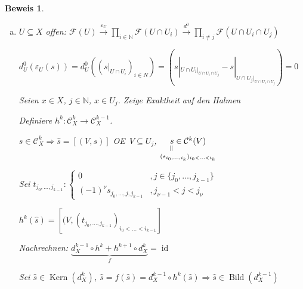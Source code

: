 \documentclass[paper = A4, fontsize=12pt, numbers=noendperiod, chapterprefix=true]{scrbook}
\theoremstyle{break}
\theoremstyle{nonumberbreak}
\newtheorem{bew}{Beweis}
\theoremstyle{nonumberplain}
\newcommand{\verteq}{\rotatebox{90}{$=$}}
\newcommand{\Prod}{\prod\limits}
\DeclareMathOperator{\Bild}{Bild}
\DeclareMathOperator{\Kern}{Kern}
\DeclareMathOperator{\id}{id}
\newcommand{\N}{\mathbb{N}}
\newcommand{\calC}{\mathcal{C}}
\newcommand{\calF}{\mathcal{F}}
\renewcommand{\OE}{O\!\!E~}
\begin{document}
\begin{bew}\begin{enumerate}[a)]\item[d)]
$U \subseteq X$ offen: $\calF(U) \xrightarrow{\varepsilon_U} \Prod_{i \in \N} \calF(U \cap U_i) \xrightarrow{d^0} \Prod_{i \ne j} \calF(U \cap U_i \cap U_j)$

$d_U^0(\varepsilon_U(s)) = d_U^0((s|_{U \cap U_i})_{i \in N}) = (s|_{U \cap U_i|_{U \cap U_i \cap U_j}} - s|_{U \cap U_j|_{U \cap U_i \cap U_j}}) = 0$

Seien $x \in X$, $j \in \N$, $x \in U_j$. Zeige Exaktheit auf den Halmen
\begin{center}\end{center}

Definiere $h^k: \calC_X^k \to \calC_X^{k-1}$.

$s \in \calC_X^k \Rightarrow \hat s = [(V, s)]$ \OE $V \subseteq U_j$, $\underset{\substack{(s_{i_0,\ldots ,i_k})_{i_0 < \ldots < i_k}}}{\underset{\verteq}{s} \in \calC^k(V)}$

Sei $t_{j_0,\ldots, j_{k-1}}: \begin{cases} 0 &, j \in \{j_0,\ldots ,j_{k-1}\} \\ (-1)^\nu s_{j_0,\ldots ,j, j_{k-1}} & ,j_{\nu - 1} < j < j_\nu \end{cases}$

$h^k(\hat s) = [(V, (t_{j_0,\ldots ,j_{k-1}})_{i_0<\ldots < i_{k-1}}]$

Nachrechnen: $\underbrace{d_X^{k-1} \circ h^k + h^{k+1} \circ d_X^k}_{f} = \id$

Sei $\hat s \in \Kern(d_X^k)$, $\hat s = f(\hat s) = d_X^{k-1} \circ h^k(\hat s) \Rightarrow \hat s \in \Bild (d_X^{k-1})$
\end{enumerate}\end{bew}
\end{document}

